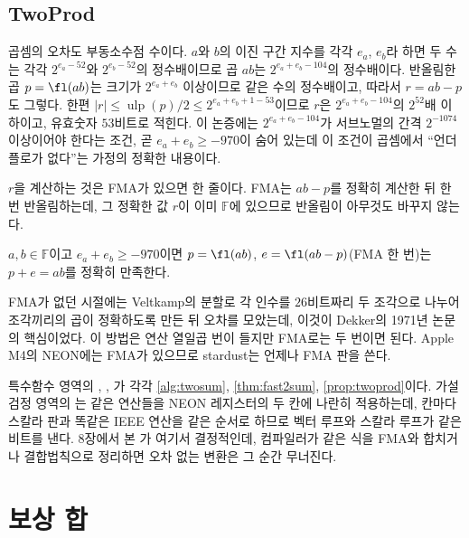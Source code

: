 \subsection{TwoProd}

곱셈의 오차도 부동소수점 수이다. $a$와 $b$의 이진 구간 지수를 각각 $e_a$, $e_b$라 하면 두 수는 각각 $2^{e_a-52}$와 $2^{e_b-52}$의 정수배이므로 곱 $ab$는 $2^{e_a+e_b-104}$의 정수배이다. 반올림한 곱 $p=\fl(ab)$는 크기가 $2^{e_a+e_b}$ 이상이므로 같은 수의 정수배이고, 따라서 $r=ab-p$도 그렇다. 한편 $|r|\le\operatorname{ulp}(p)/2\le2^{e_a+e_b+1-53}$이므로 $r$은 $2^{e_a+e_b-104}$의 $2^{52}$배 이하이고, 유효숫자 $53$비트로 적힌다. 이 논증에는 $2^{e_a+e_b-104}$가 서브노멀의 간격 $2^{-1074}$ 이상이어야 한다는 조건, 곧 $e_a+e_b\ge-970$이 숨어 있는데 이 조건이 곱셈에서 ``언더플로가 없다''는 가정의 정확한 내용이다.

$r$을 계산하는 것은 FMA가 있으면 한 줄이다. FMA는 $ab-p$를 정확히 계산한 뒤 한 번 반올림하는데, 그 정확한 값 $r$이 이미 $\mathbb F$에 있으므로 반올림이 아무것도 바꾸지 않는다.

\begin{proposition}[TwoProd]
\label{prop:twoprod}
$a,b\in\mathbb F$이고 $e_a+e_b\ge-970$이면 $p=\fl(ab)$, $e=\fl(ab-p)$(FMA 한 번)는 $p+e=ab$를 정확히 만족한다.
\end{proposition}

FMA가 없던 시절에는 Veltkamp의 분할로 각 인수를 $26$비트짜리 두 조각으로 나누어 조각끼리의 곱이 정확하도록 만든 뒤 오차를 모았는데, 이것이 Dekker의 1971년 논문의 핵심이었다\cite{dekker1971}. 이 방법은 연산 열일곱 번이 들지만 FMA로는 두 번이면 된다. Apple M4의 NEON에는 FMA가 있으므로 stardust는 언제나 FMA 판을 쓴다.

\begin{instardust}
특수함수 영역의 , , 가 각각 \cref{alg:twosum}, \cref{thm:fast2sum}, \cref{prop:twoprod}이다. 가설검정 영역의 는 같은 연산들을 NEON 레지스터의 두 칸에 나란히 적용하는데, 칸마다 스칼라 판과 똑같은 IEEE 연산을 같은 순서로 하므로 벡터 루프와 스칼라 루프가 같은 비트를 낸다. 8장에서 본 가 여기서 결정적인데, 컴파일러가  같은 식을 FMA와 합치거나 결합법칙으로 정리하면 오차 없는 변환은 그 순간 무너진다.
\end{instardust}

\section{보상 합}
\label{sec:compensated}

